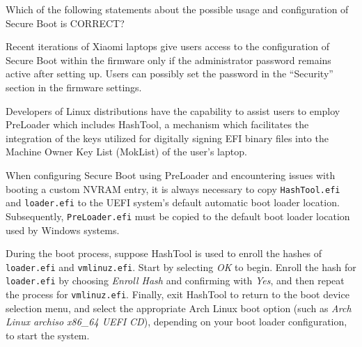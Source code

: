 \documentclass{exam-zh}
\begin{document}
\begin{question}
Which of the following statements about the possible usage and configuration of Secure Boot is CORRECT?

\begin{choices}
\item Recent iterations of Xiaomi laptops give users access to the configuration of Secure Boot within the firmware only if the administrator password remains active after setting up. Users can possibly set the password in the ``Security'' section in the firmware settings.

\item Developers of Linux distributions have the capability to assist users to employ PreLoader which includes HashTool, a mechanism which facilitates the integration of the keys utilized for digitally signing EFI binary files into the Machine Owner Key List (MokList) of the user's laptop.

\item When configuring Secure Boot using PreLoader and encountering issues with booting a custom NVRAM entry, it is always necessary to copy \texttt{HashTool.efi} and \texttt{loader.efi} to the UEFI system's default automatic boot loader location. Subsequently, \texttt{PreLoader.efi} must be copied to the default boot loader location used by Windows systems.

\item During the boot process, suppose HashTool is used to enroll the hashes of \texttt{loader.efi} and \texttt{vmlinuz.efi}. Start by selecting \textit{OK} to begin. Enroll the hash for \texttt{loader.efi} by choosing \textit{Enroll Hash} and confirming with \textit{Yes}, and then repeat the process for \texttt{vmlinuz.efi}. Finally, exit HashTool to return to the boot device selection menu, and select the appropriate Arch Linux boot option (such as \textit{Arch Linux archiso x86\_64 UEFI CD}), depending on your boot loader configuration, to start the system.
\end{choices}
\end{question}
\end{document}
